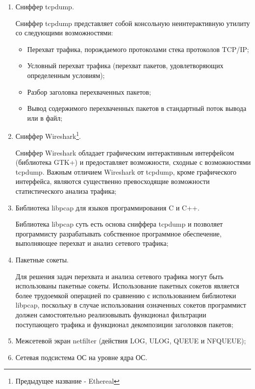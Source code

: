 	\begin{enumerate}

		\item Сниффер tcpdump.

		Сниффер tcpdump представляет собой консольную неинтерактивную утилиту со следующими возможностями:
			
			\begin{itemize}

				\item Перехват трафика, порождаемого протоколами стека протоколов TCP/IP;
				\item Условный перехват трафика (перехват пакетов, удовлетворяющих определенным условиям);
				\item Разбор заголовка перехваченных пакетов;
				\item Вывод содержимого перехваченных пакетов в стандартный поток вывода или в файл;

			\end{itemize}

		\item Сниффер Wireshark\footnote{Предыдущее название - Ethereal}.

		Сниффер Wireshark обладает графическим интерактивным интерфейсом (библиотека GTK+)
		и предоставляет возможности, сходные с возможностями tcpdump. Важным отличием Wireshark от tcpdump, кроме
		графического интерфейса, являются существенно превосходящие	возможности статистического анализа трафика;

		\item Библиотека libpcap для языков программирования C и C++.

		Библиотека libpcap суть есть основа сниффера tcpdump и позволяет программисту разрабатывать собственное
		программное обеспечение, выполняющее перехват и анализ сетевого трафика;

		\item Пакетные сокеты.

		Для решения задач перехвата и анализа сетевого трафика могут быть использованы пакетные сокеты.
		Использование пакетных сокетов является более трудоемкой операцией по сравнению с использованием
		библиотеки libpcap, поскольку в случае использования означенных сокетов программист должен самостоятельно
		реализовывать функционал фильтрации поступающего трафика и функционал декомпозиции заголовков пакетов;

		\item Межсетевой экран netfilter (действия LOG, ULOG, QUEUE и NFQUEUE);

		\item Сетевая подсистема ОС на уровне ядра ОС.

	\end{enumerate}

